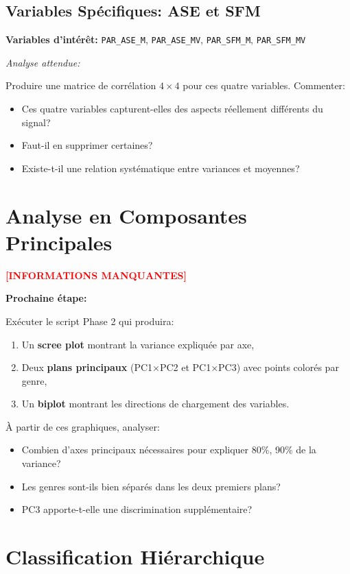 \documentclass[11pt,a4paper,french]{report}
\begin{document}
\subsection{Variables Spécifiques: ASE et SFM}

\textbf{Variables d'intérêt:} \texttt{PAR\_ASE\_M}, \texttt{PAR\_ASE\_MV}, \texttt{PAR\_SFM\_M}, \texttt{PAR\_SFM\_MV}

\textit{Analyse attendue:}

Produire une matrice de corrélation $4 \times 4$ pour ces quatre variables. Commenter:
\begin{itemize}
    \item Ces quatre variables capturent-elles des aspects réellement différents du signal?
    \item Faut-il en supprimer certaines?
    \item Existe-t-il une relation systématique entre variances et moyennes?
\end{itemize}

\section{Analyse en Composantes Principales}

\textcolor{red}{\textbf{[INFORMATIONS MANQUANTES]}}

\textbf{Prochaine étape:}

Exécuter le script Phase 2 qui produira:
\begin{enumerate}
    \item Un \textbf{scree plot} montrant la variance expliquée par axe,
    \item Deux \textbf{plans principaux} (PC1×PC2 et PC1×PC3) avec points colorés par genre,
    \item Un \textbf{biplot} montrant les directions de chargement des variables.
\end{enumerate}

À partir de ces graphiques, analyser:
\begin{itemize}
    \item Combien d'axes principaux nécessaires pour expliquer 80\%, 90\% de la variance?
    \item Les genres sont-ils bien séparés dans les deux premiers plans?
    \item PC3 apporte-t-elle une discrimination supplémentaire?
\end{itemize}

\section{Classification Hiérarchique}
\end{document}
